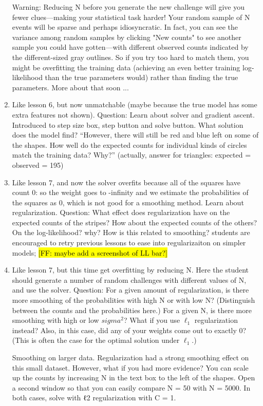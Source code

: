 \documentclass[11pt,letterpaper]{article}
\newcommand{\Note}[1]{}
\renewcommand{\Note}[1]{\hl{[#1]}}
\newcommand{\NoteSigned}[3]{{\sethlcolor{#2}\Note{#1: #3}}}
\newcommand{\NoteFF}[1]{\NoteSigned{FF}{LightBlue}{#1}}
\begin{document}
\begin{enumerate}
Warning: Reducing N before you generate the new challenge will give you fewer clues—making your statistical task harder! Your random sample of N events will be sparse and perhaps idiosyncratic. In fact, you can see the variance among random samples by clicking "New counts" to see another sample you could have gotten—with different observed counts indicated by the different-sized gray outlines. So if you try too hard to match them, you might be overfitting the training data (achieving an even better training log-likelihood than the true parameters would) rather than finding the true parameters. More about that soon ...
\item %
Like lesson 6, but now unmatchable (maybe because the true model has some extra features not shown).  
Question: Learn about solver and gradient ascent. Introduced to step size box, step button and solve button.  What solution does the model find?
``However, there will still be red and blue left on some of the shapes. How well do the expected counts for individual kinds of circles match the training data? Why?'' (actually, answer for triangles: expected = observed = 195)
\item %
Like lesson 7, and now the solver overfits because all of the squares have count 0: so the weight goes to -infinity and we estimate the probabilities of the squares as 0, which is not good for a smoothing method.  Learn about regularization.  Question: What effect does regularization have on the expected counts of the stripes?  How about the expected counts of the others?  On the log-likelihood? why? How is this related to smoothing?  
students are encouraged to retry previous lessons to ease into regularizaiton on simpler models; \NoteFF{maybe add a screenshot of LL bar?}
\item %
Like lesson 7, but this time get overfitting by reducing N.  Here the student should generate a number of random challenges with different values of N, and use the solver.  Question: For a given amount of regularization, is there more smoothing of the probabilities with high N or with low N?  (Distinguish between the counts and the probabilities here.)  For a given N, is there more smoothing with high or low $sigma^2$?
What if you use $\ell_1$ regularization instead? Also, in this case, did any of your weights come out to exactly 0? (This is often the case for the optimal solution under $\ell_1$.)

Smoothing on larger data. Regularization had a strong smoothing effect on this small dataset. However, what if you had more evidence? You can scale up the counts by increasing N in the text box to the left of the shapes. Open a second window so that you can easily compare N = 50 with N = 5000. In both cases, solve with ℓ2 regularization with C = 1.


\end{enumerate}
\end{document}
